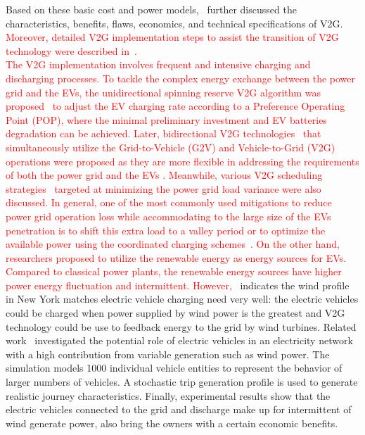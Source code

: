 Based on these basic cost and power models,~\cite{YC_Reid,YC_Sutanto,YC_Brooks} further discussed the characteristics, benefits, flaws, economics, and technical specifications of V2G. \textcolor{red}{Moreover, detailed V2G implementation steps to assist the transition of V2G technology were described in~\cite{YC_V2Gconcept2}.\\
%
%
The V2G implementation involves frequent and intensive charging and discharging processes. To tackle the complex energy exchange between the power grid and the EVs, the unidirectional spinning reserve V2G algorithm was proposed~\cite{YC_Sortomme_2} to adjust the EV charging rate according to a Preference Operating Point (POP), where the minimal preliminary investment and EV batteries degradation can be achieved. Later, bidirectional V2G technologies~\cite{YC_Shafie-khah,YC_Nguyen,YC_Xie} that simultaneously utilize the Grid-to-Vehicle (G2V) and Vehicle-to-Grid (V2G) operations were proposed as they are more flexible in addressing the requirements of both the power grid and the EVs . Meanwhile, various V2G scheduling strategies~\cite{YC_Sortomme,YC_Jian_2,YC_Kordkheili} targeted at minimizing the power grid load variance were also discussed. In general, one of the most commonly used mitigations to reduce power grid operation loss while accommodating to the large size of the EVs penetration is to shift this extra load to a valley period or to optimize the available power using the coordinated charging schemes~\cite{YC_Fernandez}. On the other hand, researchers proposed to utilize the renewable energy as energy sources for EVs. Compared to classical power plants, the renewable energy sources have higher power energy fluctuation and intermittent. However,}~\cite{YC_newyork} indicates the wind profile in New York matches electric vehicle charging need very well: the electric vehicles could be charged when power supplied by wind power is the greatest and V2G technology could be use to feedback energy to the grid by wind turbines.
Related work~\cite{YC_DRUITT2012104} investigated the potential role of electric vehicles in an electricity network with a high contribution from variable generation such as wind power. The simulation models 1000 individual vehicle entities to represent the behavior of larger numbers of vehicles. 
A stochastic trip generation profile is used to generate realistic journey characteristics. 
Finally, experimental results show that the electric vehicles connected to the grid and discharge make up for intermittent of wind generate power, also bring the owners with a certain economic benefits.



